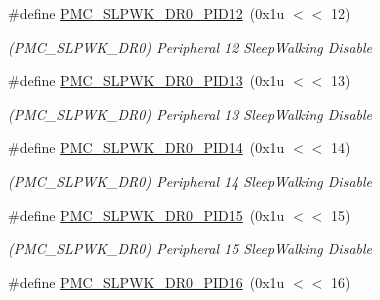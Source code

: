 \begin{DoxyCompactItemize}
\mbox{\label{group__SAMS70__PMC_ga5190bf95bc37a6b05d1a669664b3d4fd}} 
\#define \mbox{\hyperlink{group__SAMS70__PMC_ga5190bf95bc37a6b05d1a669664b3d4fd}{P\+M\+C\+\_\+\+S\+L\+P\+W\+K\+\_\+\+D\+R0\+\_\+\+P\+I\+D12}}~(0x1u $<$$<$ 12)
\begin{DoxyCompactList}\small\item\em (P\+M\+C\+\_\+\+S\+L\+P\+W\+K\+\_\+\+D\+R0) Peripheral 12 Sleep\+Walking Disable \end{DoxyCompactList}\item 
\mbox{\label{group__SAMS70__PMC_ga5a77c1b7943aa2544f0543c6e9a39e28}} 
\#define \mbox{\hyperlink{group__SAMS70__PMC_ga5a77c1b7943aa2544f0543c6e9a39e28}{P\+M\+C\+\_\+\+S\+L\+P\+W\+K\+\_\+\+D\+R0\+\_\+\+P\+I\+D13}}~(0x1u $<$$<$ 13)
\begin{DoxyCompactList}\small\item\em (P\+M\+C\+\_\+\+S\+L\+P\+W\+K\+\_\+\+D\+R0) Peripheral 13 Sleep\+Walking Disable \end{DoxyCompactList}\item 
\mbox{\label{group__SAMS70__PMC_ga2fda27a3f63352ad94ffa139e673ce3b}} 
\#define \mbox{\hyperlink{group__SAMS70__PMC_ga2fda27a3f63352ad94ffa139e673ce3b}{P\+M\+C\+\_\+\+S\+L\+P\+W\+K\+\_\+\+D\+R0\+\_\+\+P\+I\+D14}}~(0x1u $<$$<$ 14)
\begin{DoxyCompactList}\small\item\em (P\+M\+C\+\_\+\+S\+L\+P\+W\+K\+\_\+\+D\+R0) Peripheral 14 Sleep\+Walking Disable \end{DoxyCompactList}\item 
\mbox{\label{group__SAMS70__PMC_gaa01d43dceb9334f103ded15534d67f73}} 
\#define \mbox{\hyperlink{group__SAMS70__PMC_gaa01d43dceb9334f103ded15534d67f73}{P\+M\+C\+\_\+\+S\+L\+P\+W\+K\+\_\+\+D\+R0\+\_\+\+P\+I\+D15}}~(0x1u $<$$<$ 15)
\begin{DoxyCompactList}\small\item\em (P\+M\+C\+\_\+\+S\+L\+P\+W\+K\+\_\+\+D\+R0) Peripheral 15 Sleep\+Walking Disable \end{DoxyCompactList}\item 
\mbox{\label{group__SAMS70__PMC_ga6b9a8c51ed8298f8ba49da09ab55980d}} 
\#define \mbox{\hyperlink{group__SAMS70__PMC_ga6b9a8c51ed8298f8ba49da09ab55980d}{P\+M\+C\+\_\+\+S\+L\+P\+W\+K\+\_\+\+D\+R0\+\_\+\+P\+I\+D16}}~(0x1u $<$$<$ 16)
$$
\end{DoxyCompactItemize}
